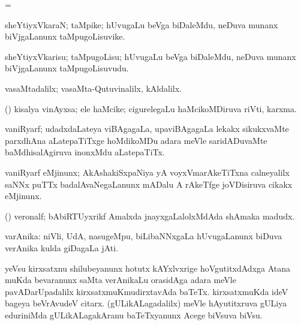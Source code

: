 {{{\bentry
{} 
\gl{\sakirx}
\expl{}
\bmng
 =  
\emng
\eentry

\bentry
{} 
\gl{\nA}
\expl{}
\bmng
 sheYtiyxVkaraN; taMpike; hUvugaLu beVga biDaleMdu, neDuva munanx biVjgaLanunx taMpugoLisuvike. 
\emng
\eentry

\bentry
{} 
\gl{\sakirx}
\expl{}
\bmng
 sheYtiyxVkarisu; taMpugoLisu; hUvugaLu beVga biDaleMdu, neDuva munanx biVjgaLanunx taMpugoLisuvudu. 
\emng
\eentry

\bentry
{} 
\gl{\kirxvi}
\expl{}
\bmng
 vasaMtadalilx; vasaMta-Qutuvinalilx, kAldalilx. 
\emng
\eentry

\bentry
{} 
\gl{\nA}
\expl{}
\bmng
 (\savi) kisalya vinAyxsa; ele haMcike; cigurelegaLu haMcikoMDiruva riVti, karxma. 
\emng
\eentry

\bentry
{} 
\gl{\nA}
\expl{}
\bmng
\emng
\eentry

\bentry
{} 
\gl{\nA}
\expl{}
\bmng
 vaniRyarf; udadxdaLateya viBAgagaLa, upaviBAgagaLa lekakx sikukxvaMte parxdhAna aLatepaTiTxge hoMdikoMDu adara meVle saridADuvaMte baMdhisalAgiruva inonxMdu aLatepaTiTx. 
\emng
\eentry

\bentry 
{}
\gl{\nA}
\expl{}
\bmng
 vaniRyarf eMjinunx; AkAshakiSxpaNiya yA voyxVmarAkeTiTxna calneyalilx saNNx puTTx badalAvaNegaLanunx mADalu A rAkeTfge joVDisiruva cikakx eMjinunx. 
\emng
\eentry

\bentry
{} 
\gl{\nA}
\expl{}
\bmng
 (\ravi) veronalf; bAbiRTUyxrikf Amalxda jnayxgaLalolxMdAda shAmaka madudx. 
\emng
\eentry

\bentry
{} 
\gl{\nA}
\expl{}
\bmng
 varAnika: 
\banum
{} niVli, UdA, nasugeMpu, biLibaNNxgaLa hUvugaLanunx biDuva verAnika kulda giDagaLa jAti. 
\hypertarget{veronica(b)}{} 
 yeVsu kirxsatxnu shilubeyanunx hotutx kAYxlvxrige hoVgutitxdAdxga Atana muKda bevaranunx saMta verAnikaLu orasidAga adara meVle pavADarUpadalilx kirxsatxmuKmudirxtavAda baTeTx. 
 kirxsatxmuKda ideV bageya beVrAvudeV citarx. 
 (gULikALagadalilx) meVle hAyutitxruva gULiya eduriniMda gULikALagakAranu baTeTxyanunx Acege biVsuva biVsu. 
\eanum
\emng
\eentry

}}}
